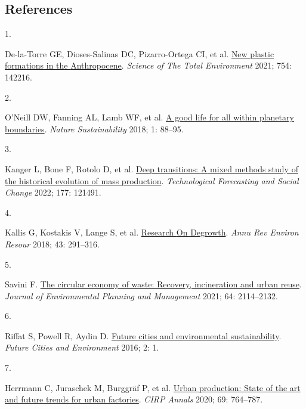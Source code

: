 \documentclass[
  11pt,
  a4paperpaper,
  onecolumn]{article}
\newlength{\cslhangindent}
\newlength{\csllabelwidth}
\newlength{\cslentryspacingunit} %
\newenvironment{CSLReferences}[2] %
 {%
  \setlength{\parindent}{0pt}
  \ifodd #1
  \let\oldpar\par
  \def\par{\hangindent=\cslhangindent\oldpar}
  \fi
  \setlength{\parskip}{#2\cslentryspacingunit}
 }%
 {}
\newcommand{\CSLLeftMargin}[1]{\parbox[t]{\csllabelwidth}{#1}}
\newcommand{\CSLRightInline}[1]{\parbox[t]{\linewidth - \csllabelwidth}{#1}\break}
\begin{document}
\newpage

\hypertarget{references}{%
\subsection*{References}\label{references}}

\hypertarget{refs}{}
\begin{CSLReferences}{0}{0}
\leavevmode{}%
\CSLLeftMargin{1. }%
\CSLRightInline{De-la-Torre GE, Dioses-Salinas DC, Pizarro-Ortega CI, et
al. \href{https://doi.org/10.1016/j.scitotenv.2020.142216}{New plastic
formations in the {Anthropocene}}. \emph{Science of The Total
Environment} 2021; 754: 142216.}

\leavevmode{}%
\CSLLeftMargin{2. }%
\CSLRightInline{O'Neill DW, Fanning AL, Lamb WF, et al.
\href{https://doi.org/10.1038/s41893-018-0021-4}{A good life for all
within planetary boundaries}. \emph{Nature Sustainability} 2018; 1:
88--95.}

\leavevmode{}%
\CSLLeftMargin{3. }%
\CSLRightInline{Kanger L, Bone F, Rotolo D, et al.
\href{https://doi.org/10.1016/J.TECHFORE.2022.121491}{Deep transitions:
{A} mixed methods study of the historical evolution of mass production}.
\emph{Technological Forecasting and Social Change} 2022; 177: 121491.}

\leavevmode{}%
\CSLLeftMargin{4. }%
\CSLRightInline{Kallis G, Kostakis V, Lange S, et al.
\href{https://doi.org/10.1146/annurev-environ-102017-025941}{Research
{On Degrowth}}. \emph{Annu Rev Environ Resour} 2018; 43: 291--316.}

\leavevmode{}%
\CSLLeftMargin{5. }%
\CSLRightInline{Savini F.
\href{https://doi.org/10.1080/09640568.2020.1857226}{The circular
economy of waste: Recovery, incineration and urban reuse}. \emph{Journal
of Environmental Planning and Management} 2021; 64: 2114--2132.}

\leavevmode{}%
\CSLLeftMargin{6. }%
\CSLRightInline{Riffat S, Powell R, Aydin D.
\href{https://doi.org/10.1186/s40984-016-0014-2}{Future cities and
environmental sustainability}. \emph{Future Cities and Environment}
2016; 2: 1.}

\leavevmode{}%
\CSLLeftMargin{7. }%
\CSLRightInline{Herrmann C, Juraschek M, Burggräf P, et al.
\href{https://doi.org/10.1016/j.cirp.2020.05.003}{Urban production:
{State} of the art and future trends for urban factories}. \emph{CIRP
Annals} 2020; 69: 764--787.}


\end{CSLReferences}
\end{document}
